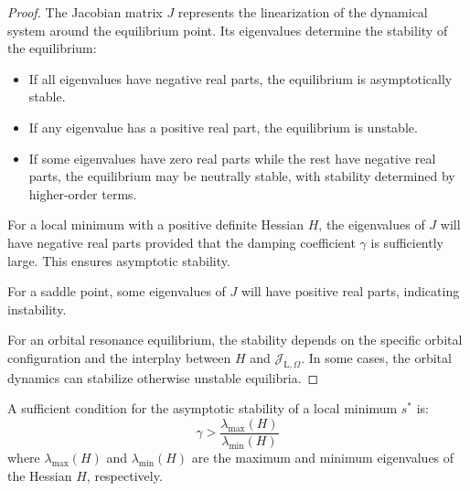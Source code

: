 \begin{proof}
The Jacobian matrix $J$ represents the linearization of the dynamical system around the equilibrium point. Its eigenvalues determine the stability of the equilibrium:
\begin{itemize}
    \item If all eigenvalues have negative real parts, the equilibrium is asymptotically stable.
    \item If any eigenvalue has a positive real part, the equilibrium is unstable.
    \item If some eigenvalues have zero real parts while the rest have negative real parts, the equilibrium may be neutrally stable, with stability determined by higher-order terms.
\end{itemize}

For a local minimum with a positive definite Hessian $H$, the eigenvalues of $J$ will have negative real parts provided that the damping coefficient $\gamma$ is sufficiently large. This ensures asymptotic stability.

For a saddle point, some eigenvalues of $J$ will have positive real parts, indicating instability.

For an orbital resonance equilibrium, the stability depends on the specific orbital configuration and the interplay between $H$ and $\mathcal{J}_{\text{L},\Omega}$. In some cases, the orbital dynamics can stabilize otherwise unstable equilibria.
\end{proof}

\begin{theorem}
A sufficient condition for the asymptotic stability of a local minimum $s^*$ is:
\begin{equation}
\gamma > \frac{\lambda_{\max}(H)}{\lambda_{\min}(H)}
\end{equation}
where $\lambda_{\max}(H)$ and $\lambda_{\min}(H)$ are the maximum and minimum eigenvalues of the Hessian $H$, respectively.
\end{theorem}

